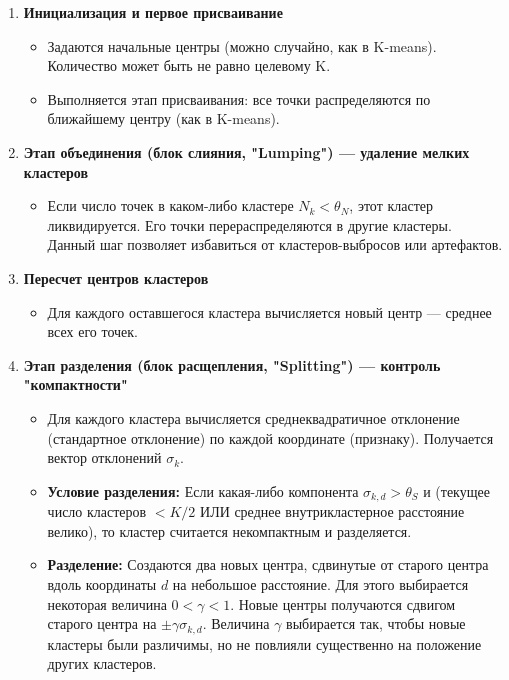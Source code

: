 \documentclass[11pt]{article}
\begin{document}
\begin{enumerate}
    \item \textbf{Инициализация и первое присваивание}
    \begin{itemize}
        \item Задаются начальные центры (можно случайно, как в K-means). Количество может быть не равно целевому K.
        \item Выполняется этап присваивания: все точки распределяются по ближайшему центру (как в K-means).
    \end{itemize}
    
    \item \textbf{Этап объединения (блок слияния, "Lumping") — удаление мелких кластеров}
    \begin{itemize}
        \item Если число точек в каком-либо кластере $N_k < \theta_N$, этот кластер ликвидируется. Его точки перераспределяются в другие кластеры. Данный шаг позволяет избавиться от кластеров-выбросов или артефактов.
    \end{itemize}
    
    \item \textbf{Пересчет центров кластеров}
    \begin{itemize}
        \item Для каждого оставшегося кластера вычисляется новый центр — среднее всех его точек.
    \end{itemize}
    
    \item \textbf{Этап разделения (блок расщепления, "Splitting") — контроль "компактности"}
    \begin{itemize}
        \item Для каждого кластера вычисляется среднеквадратичное отклонение (стандартное отклонение) по каждой координате (признаку). Получается вектор отклонений $\sigma_k$.
        \item \textbf{Условие разделения:} Если какая-либо компонента $\sigma_{k,d} > \theta_S$ и (текущее число кластеров $< K/2$ ИЛИ среднее внутрикластерное расстояние велико), то кластер считается некомпактным и разделяется.
        \item \textbf{Разделение:} Создаются два новых центра, сдвинутые от старого центра вдоль координаты $d$ на небольшое расстояние. Для этого выбирается некоторая величина $0 < \gamma < 1$. Новые центры получаются сдвигом старого центра на $\pm \gamma \sigma_{k,d}$. Величина $\gamma$ выбирается так, чтобы новые кластеры были различимы, но не повлияли существенно на положение других кластеров.
    \end{itemize}
    

\end{enumerate}
\end{document}
